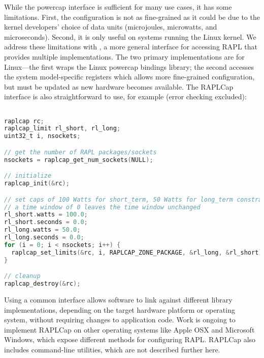 While the powercap interface is sufficient for many use cases, it has some limitations.
First, the configuration is not as fine-grained as it could be due to the kernel developers' choice of data units (microjoules, microwatts, and microseconds).
Second, it is only useful on systems running the Linux kernel.
We address these limitations with , a more general interface for accessing RAPL that provides multiple implementations.
The two primary implementations are for Linux---the first wraps the Linux powercap bindings library; the second accesses the system model-specific registers which allows more fine-grained configuration, but must be updated as new hardware becomes available.
The RAPLCap interface is also straightforward to use, for example (error checking excluded):
%
\begin{lstlisting}[language=C,%
  caption={Setting RAPL power caps with RAPLCap.},%
  morekeywords={uint32_t},%
  label={lst:raplcap-example}]%

raplcap rc;
raplcap_limit rl_short, rl_long;
uint32_t i, nsockets;

// get the number of RAPL packages/sockets
nsockets = raplcap_get_num_sockets(NULL);

// initialize
raplcap_init(&rc);

// set caps of 100 Watts for short_term, 50 Watts for long_term constraints on each socket
// a time window of 0 leaves the time window unchanged
rl_short.watts = 100.0;
rl_short.seconds = 0.0;
rl_long.watts = 50.0;
rl_long.seconds = 0.0;
for (i = 0; i < nsockets; i++) {
  raplcap_set_limits(&rc, i, RAPLCAP_ZONE_PACKAGE, &rl_long, &rl_short);
}

// cleanup
raplcap_destroy(&rc);
\end{lstlisting}

Using a common interface allows software to link against different library implementations, depending on the target hardware platform or operating system, without requiring changes to application code.
Work is ongoing to implement RAPLCap on other operating systems like Apple OSX and Microsoft Windows, which expose different methods for configuring RAPL.
RAPLCap also includes command-line utilities, which are not described further here.
